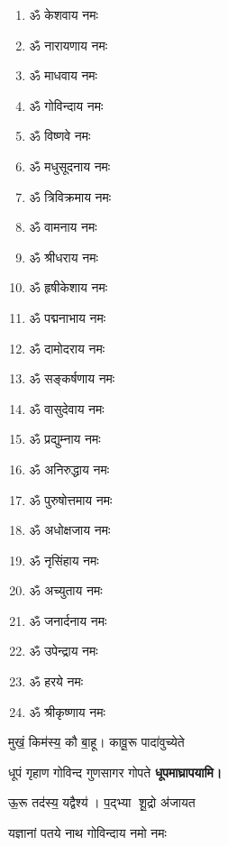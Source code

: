 \begin{center}
\begin{multicols}{2}
\begin{enumerate}
\item ॐ केशवाय नमः
\item ॐ नारायणाय नमः
\item ॐ माधवाय नमः
\item ॐ गोविन्दाय नमः
\item ॐ विष्णवे नमः 
\item ॐ मधुसूदनाय नमः
\item ॐ त्रिविक्रमाय नमः
\item ॐ वामनाय नमः
\item ॐ श्रीधराय नमः
\item ॐ हृषीकेशाय नमः
\item ॐ पद्मनाभाय नमः
\item ॐ दामोदराय नमः
\item ॐ सङ्कर्षणाय नमः
\item ॐ वासुदेवाय नमः
\item ॐ प्रद्युम्नाय नमः
\item ॐ अनिरुद्धाय नमः
\item ॐ पुरुषोत्तमाय नमः
\item ॐ अधोक्षजाय नमः
\item ॐ नृसिंहाय नमः
\item ॐ अच्युताय नमः
\item ॐ जनार्दनाय नमः
\item ॐ उपेन्द्राय नमः 
\item ॐ हरये नमः
\item ॐ श्रीकृष्णाय नमः
\end{enumerate}
\end{multicols}

\begingroup
\centering
\setlength{\columnseprule}{1pt}
\let\chapt\sect
\needspace{6em}

\endgroup


{मुखं॒ किम॑स्य॒ कौ बा॒हू। कावू॒रू पादा॑वुच्येते}

{धूपं गृहाण गोविन्द गुणसागर गोपते}
\textbf{\devAya{} धूपमाघ्रापयामि।}
\medskip

{ऊ॒रू तद॑स्य॒ यद्वैश्य॑। प॒द्भ्या शू॒द्रो अ॑जायत}

{यज्ञानां पतये नाथ गोविन्दाय नमो नमः}


\end{center}

